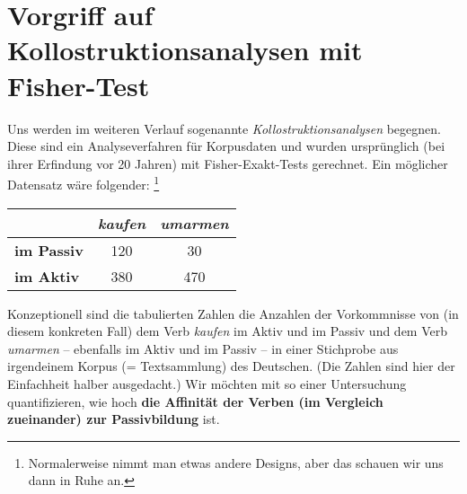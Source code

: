 

\section{Vorgriff auf Kollostruktionsanalysen mit Fisher-Test}

Uns werden im weiteren Verlauf sogenannte \textit{Kollostruktionsanalysen} begegnen.
Diese sind ein Analyseverfahren für Korpusdaten und wurden ursprünglich (bei ihrer Erfindung vor 20 Jahren) mit Fisher-Exakt-Tests gerechnet.
Ein möglicher Datensatz wäre folgender:%
\footnote{Normalerweise nimmt man etwas andere Designs, aber das schauen wir uns dann in Ruhe an.}

\begin{center}
\begin{tabular}[h]{|l|c|c|}
  \cline{2-3}
  \multicolumn{1}{c|}{} & \textbf{\textit{kaufen}} & \textbf{\textit{umarmen}} \\\hline
  \textbf{im Passiv} & 120 & 30 \\\hline
  \textbf{im Aktiv} & 380 & 470 \\\hline
\end{tabular}
\end{center}

Konzeptionell sind die tabulierten Zahlen die Anzahlen der Vorkommnisse von (in diesem konkreten Fall) dem Verb \textit{kaufen} im Aktiv und im Passiv und dem Verb \textit{umarmen} -- ebenfalls im Aktiv und im Passiv -- in einer Stichprobe aus irgendeinem Korpus (= Textsammlung) des Deutschen.
(Die Zahlen sind hier der Einfachheit halber ausgedacht.)
Wir möchten mit so einer Untersuchung quantifizieren, wie hoch \textbf{die Affinität der Verben (im Vergleich zueinander) zur Passivbildung} ist.

